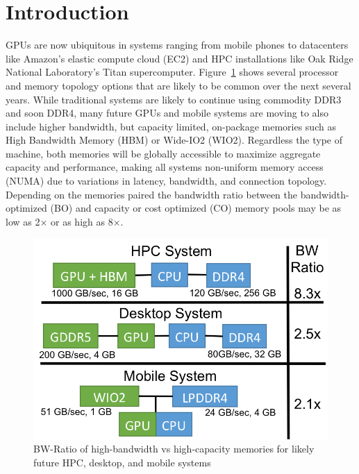 \section{Introduction}
GPUs are now ubiquitous in systems ranging from mobile phones to datacenters like 
Amazon's elastic compute cloud (EC2) and HPC installations like Oak Ridge 
National Laboratory's Titan supercomputer.
Figure~\ref{fig:arch} shows several processor and memory topology options that
are likely to be common over the next several years. While traditional systems
are likely to continue using commodity DDR3 and soon DDR4, many future GPUs and
mobile systems are moving to also include higher bandwidth, but capacity
limited, on-package memories such as High Bandwidth Memory (HBM) or Wide-IO2
(WIO2)\@. Regardless the type of machine, both memories will be globally
accessible to maximize aggregate capacity and performance, making all systems
non-uniform memory access (NUMA) due to variations in latency, bandwidth, and
connection topology. Depending on the memories paired the bandwidth ratio
between the bandwidth-optimized (BO) and capacity or cost optimized (CO) memory
pools may be as low as 2$\times$ or as high as 8$\times$.

\begin{figure}[t]
    \centering
    \includegraphics[width=0.8\columnwidth]{asplos2015/figures/arch}
    \caption{BW-Ratio of high-bandwidth vs high-capacity memories for likely future HPC, desktop, and mobile systems}
    \label{fig:arch}
\end{figure}


